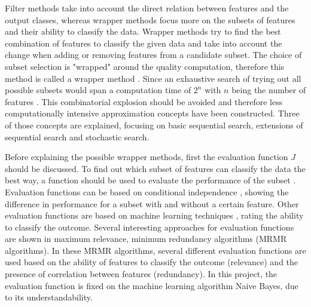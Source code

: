 \documentclass[10pt,a4paper]{report}
\begin{document}
	Filter methods take into account the direct relation between features and the output classes, whereas wrapper methods focus more on the subsets of features and their ability to classify the data. Wrapper methods try to find the best combination of features to classify the given data and take into account the change when adding or removing features from a candidate subset. The choice of subset selection is "wrapped"  around the quality computation, therefore this method is called a wrapper method \cite{Reunanen2006}. Since an exhaustive search of trying out all possible subsets would span a computation time of $2^n$ with $n$ being the number of features \cite{Alsallakh2016PowerSet}. This combinatorial explosion should be avoided and therefore less computationally intensive approximation concepts have been constructed. Three of those concepts are explained, focusing on basic sequential search, extensions of sequential search and stochastic search.
	
	Before explaining the possible wrapper methods, first the evaluation function $J$ should be discussed. To find out which subset of features can classify the data the best way, a function should be used to evaluate the performance of the subset \cite{Reunanen2006}. Evaluation functions can be based on conditional independence \cite{Reunanen2006,tsamardinos2017massively}, showing the difference in performance for a subset with and without a certain feature. Other evaluation functions are based on machine learning techniques \cite{huang2013automated, saeys2007review}, rating the ability to classify the outcome. Several interesting approaches for evaluation functions are shown in maximum relevance, minimum redundancy algorithms \cite{SENAWI201747, el2009new, radovic2017minimum} (MRMR algorithms). In these MRMR algorithms, several different evaluation functions are used based on the ability of features to classify the outcome (relevance) and the presence of correlation between features (redundancy). In this project, the evaluation function is fixed on the machine learning algorithm Naive Bayes, due to its understandability.
	
\end{document}
